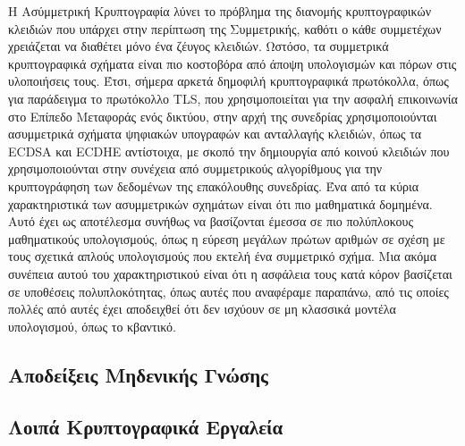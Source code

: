Η Ασύμμετρική Κρυπτογραφία λύνει το πρόβλημα της διανομής κρυπτογραφικών κλειδιών που υπάρχει στην περίπτωση της Συμμετρικής, καθότι ο κάθε συμμετέχων χρειάζεται να διαθέτει μόνο ένα ζέυγος κλειδιών. Ωστόσο, τα συμμετρικά κρυπτογραφικά σχήματα είναι πιο κοστοβόρα από άποψη υπολογισμών και πόρων στις υλοποιήσεις τους. Έτσι, σήμερα αρκετά δημοφιλή κρυπτογραφικά πρωτόκολλα, όπως για παράδειγμα το πρωτόκολλο TLS, που χρησιμοποιείται για την ασφαλή επικοινωνία στο Επίπεδο Μεταφοράς ενός δικτύου, στην αρχή της συνεδρίας χρησιμοποιούνται ασυμμετρικά σχήματα ψηφιακών υπογραφών και ανταλλαγής κλειδιών, όπως τα ECDSA και ECDHE αντίστοιχα, με σκοπό την δημιουργία από κοινού κλειδιών που χρησιμοποιούνται στην συνέχεια από συμμετρικούς αλγορίθμους για την κρυπτογράφηση των δεδομένων της επακόλουθης συνεδρίας. Ένα από τα κύρια χαρακτηριστικά των ασυμμετρικών σχημάτων είναι ότι πιο μαθηματικά δομημένα. Αυτό έχει ως αποτέλεσμα συνήθως να βασίζονται έμεσσα σε πιο πολύπλοκους μαθηματικούς υπολογισμούς, όπως η εύρεση μεγάλων πρώτων αριθμών σε σχέση με τους σχετικά απλούς υπολογισμούς που εκτελή ένα συμμετρικό σχήμα. Μια ακόμα συνέπεια αυτού του χαρακτηριστικού είναι ότι η ασφάλεια τους κατά κόρον βασίζεται σε υποθέσεις πολυπλοκότητας, όπως αυτές που αναφέραμε παραπάνω, από τις οποίες πολλές από αυτές έχει αποδειχθεί ότι δεν ισχύουν σε μη κλασσικά μοντέλα υπολογισμού, όπως το κβαντικό.

\subsection{Αποδείξεις Μηδενικής Γνώσης}



\subsection{Λοιπά Κρυπτογραφικά Εργαλεία}

